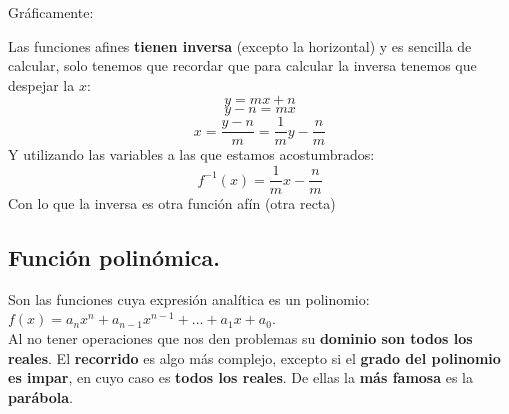 \documentclass[a4paper,11pt,answers]{exam}
\begin{document}
Gráficamente:
\begin{center}
\hspace{1cm}
\end{center}

Las funciones afines \textbf{tienen inversa} (excepto la horizontal) y es sencilla de calcular, solo tenemos que recordar que para calcular la inversa tenemos que despejar la $x$:
\[y= mx +n\]
\[y-n = mx\]
\[x = \frac{y -n}{m} = \frac{1}{m}y - \frac{n}{m}\]
Y utilizando las variables a las que estamos acostumbrados:
\[f^{-1}(x) = \frac{1}{m}x - \frac{n}{m}\]
Con lo que la inversa es otra función afín (otra recta)
\subsection{Función polinómica.}
Son las funciones cuya expresión analítica es un polinomio: $f(x) = a_n x^n + a_{n-1} x^{n-1}+...+a_1 x + a_0$.\\
Al no tener operaciones que nos den problemas su \textbf{dominio son todos los reales}. El \textbf{recorrido} es algo más complejo, excepto si el \textbf{grado del polinomio es impar}, en cuyo caso es \textbf{todos los reales}.
De ellas la \textbf{más famosa} es la \textbf{parábola}.
\end{document}
